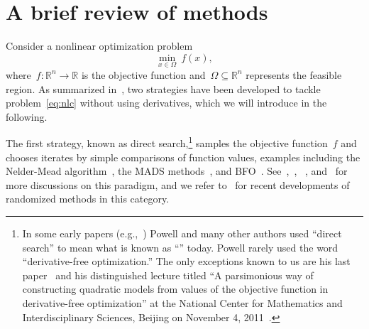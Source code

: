 \documentclass[
    smallextended,  %
    final,          %
]{svjour3}
\newcommand{\R}{\mathbb{R}}
\newcommand{\fset}{\Omega}
\newcommand{\obj}{f}
\begin{document}
\section{A brief review of  methods}
\label{sec:dfo}

Consider a nonlinear optimization problem
\begin{equation}
    \label{eq:nlc}
    \min_{x \in \fset} ~ \obj(x),
\end{equation}
where~$\obj : \R^n \to \R$ is the objective function and~$\fset \subseteq \R^n$ represents the feasible region.
As summarized in~\cite{Conn_Scheinberg_Vicente_2009b}, two strategies have been developed to tackle
problem~\eqref{eq:nlc} without using derivatives, which we will introduce in the following.

The first strategy, known as direct search,\footnote{In some early papers (e.g.,~\cite{Powell_1994,Powell_1998})
Powell and many other authors used ``direct search'' to mean what is known as ``'' today. Powell rarely used the word ``derivative-free optimization.''
The only exceptions known to us are his last paper~\cite{Powell_2015} and his distinguished lecture
titled ``A parsimonious way of constructing quadratic models from values of the objective function in
derivative-free optimization'' at the National Center for Mathematics and Interdisciplinary Sciences,
Beijing on November 4, 2011~\cite{Buhmann_Fletcher_Iserles_Toint_2018}.}
samples the objective function~$\obj$ and chooses iterates by simple comparisons of function values, examples including
the Nelder-Mead algorithm~\cite{Nelder_Mead_1965}, the MADS methods~\cite{Audet_Dennis_2006,Digabel_2011}, and BFO~\cite{Porcelli_Toint_2017,Porcelli_Toint_2020,Porcelli_Toint_2022}.
See~\cite{Kolda_Lewis_Torczon_2003},~\cite[Chapters~7 and~8]{Conn_Scheinberg_Vicente_2009b},
~\cite[Part~3]{Audet_Hare_2017}, and~\cite[\S~2.1]{Larson_Menickelly_Wild_2019} for more discussions
on this paradigm, and we refer to~\cite{Gratton_Etal_2015,Gratton_Etal_2019} for recent developments
of randomized methods in this category.
\end{document}
